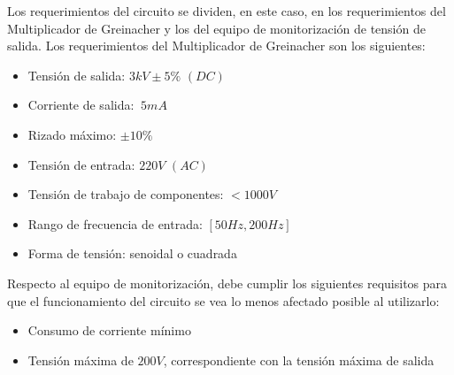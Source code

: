 Los requerimientos del circuito se dividen, en este caso, en los requerimientos del Multiplicador de Greinacher y los del equipo de monitorización
de tensión de salida. Los requerimientos del Multiplicador de Greinacher son los siguientes:

\begin{itemize}
    \item Tensión de salida: $3kV \pm 5\%\,\, \left(DC\right)$
    \item Corriente de salida: $~5mA$
    \item Rizado máximo: $\pm 10\%$
    \item Tensión de entrada: $220V\,\, \left(AC\right)$
    \item Tensión de trabajo de componentes: $<1000V$
    \item Rango de frecuencia de entrada: $\left[50Hz, 200Hz\right]$
    \item Forma de tensión: senoidal o cuadrada
\end{itemize}

Respecto al equipo de monitorización, debe cumplir los siguientes requisitos para que el funcionamiento del circuito se vea 
lo menos afectado posible al utilizarlo:

\begin{itemize}
    \item Consumo de corriente mínimo
    \item Tensión máxima de $200V$, correspondiente con la tensión máxima de salida
\end{itemize}
